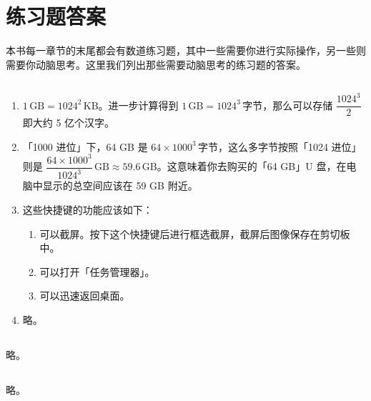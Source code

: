 \chapter{练习题答案}
\label{cha:answers}
\fancyhead[OR]{\bfseries\color{missing}\nouppercase\rightmark}
\setcounter{section}{-1}

本书每一章节的末尾都会有数道练习题，其中一些需要你进行实际操作，另一些则需要你动脑思考。这里我们列出那些需要动脑思考的练习题的答案。

\section{}

\begin{enumerate}
  \item $1\,\mathrm{GB}=1024^2\,\mathrm{KB}$。进一步计算得到 $1\,\mathrm{GB}=1024^3\,\text{字节}$，那么可以存储 $\dfrac{1024^3}{2}$ 即大约 5 亿个汉字。
  \item 「1000 进位」下，64 GB 是 $64\times1000^3\,\text{字节}$，这么多字节按照「1024 进位」则是 $\dfrac{64\times1000^3}{1024^3}\,\mathrm{GB}\approx59.6\,\mathrm{GB}$。这意味着你去购买的「64 GB」U 盘，在电脑中显示的总空间应该在 59 GB 附近。
  \item 这些快捷键的功能应该如下：
  \begin{enumerate}
    \item 可以截屏。按下这个快捷键后进行框选截屏，截屏后图像保存在剪切板中。
    \item 可以打开「任务管理器」。
    \item 可以迅速返回桌面。
  \end{enumerate}
  \item 略。
\end{enumerate}

\section{}

略。

\section{}

略。

\section{}

